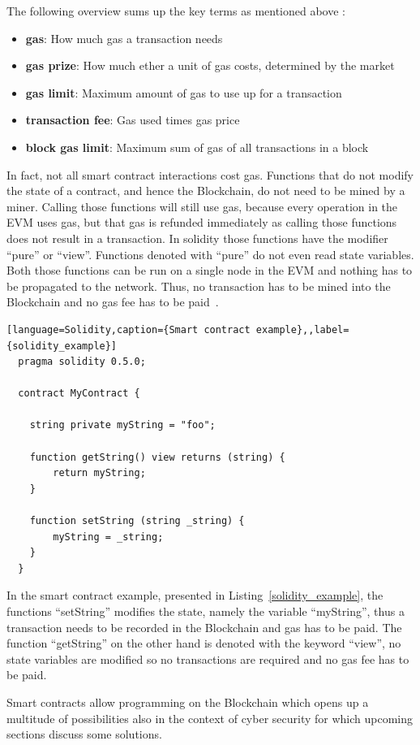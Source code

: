 The following overview sums up the key terms as mentioned above \cite{blockgeeks}:
\begin{itemize}
  \item {\textbf{gas}: How much gas a transaction needs }
  \item {\textbf{gas prize}: How much ether a unit of gas costs, determined by the market}
  \item {\textbf{gas limit}: Maximum amount of gas to use up for a transaction}
  \item {\textbf{transaction fee}: Gas used times gas price}
  \item {\textbf{block gas limit}: Maximum sum of gas of all transactions in a block}

\end{itemize}

In fact, not all smart contract interactions cost gas. Functions that do not modify the state of a contract, and hence the Blockchain, do not need to be mined by a miner.
Calling those functions will still use gas, because every operation in the EVM uses gas, but that gas is refunded immediately as calling those functions does not result in a transaction.
In solidity those functions have the modifier ``pure'' or ``view''. Functions denoted with ``pure'' do not even read state variables. Both those functions can be run on a single node in the EVM and
nothing has to be propagated to the network. Thus, no transaction has to be mined into the Blockchain and no gas fee has to be paid~\cite{blockgeeks}.

\begin{lstlisting}[language=Solidity,caption={Smart contract example},,label={solidity_example}]
  pragma solidity 0.5.0;

  contract MyContract {

    string private myString = "foo";

    function getString() view returns (string) {
        return myString;
    }

    function setString (string _string) {
        myString = _string;
    }
  }
  \end{lstlisting}

In the smart contract example, presented in Listing~\ref{solidity_example}, the functions ``setString'' modifies the state, namely the variable ``myString'', thus a transaction needs to be recorded in the Blockchain and gas has to be paid.
The function ``getString'' on the other hand is denoted with the keyword ``view'', no state variables are modified so no transactions are required and no gas fee has to be paid.

Smart contracts allow programming on the Blockchain which opens up a multitude of possibilities also in the context of cyber security for which upcoming sections discuss some solutions.
